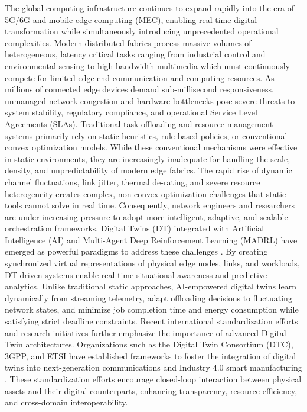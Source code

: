 \documentclass[twoside,twocolumn,10pt]{article}
\begin{document}
The global computing infrastructure continues to expand rapidly into the era of 5G/6G and mobile edge computing (MEC), enabling real-time digital transformation while simultaneously introducing unprecedented operational complexities.
Modern distributed fabrics process massive volumes of heterogeneous, latency critical tasks ranging from industrial control and environmental sensing to high bandwidth multimedia which must continuously compete for limited edge-end communication and computing resources.
As millions of connected edge devices demand sub-millisecond responsiveness, unmanaged network congestion and hardware bottlenecks pose severe threats to system stability, regulatory compliance, and operational Service Level Agreements (SLAs).
Traditional task offloading and resource management systems primarily rely on static heuristics, rule-based policies, or conventional convex optimization models.
While these conventional mechanisms were effective in static environments, they are increasingly inadequate for handling the scale, density, and unpredictability of modern edge fabrics.
The rapid rise of dynamic channel fluctuations, link jitter, thermal de-rating, and severe resource heterogeneity creates complex, non-convex optimization challenges that static tools cannot solve in real time.
Consequently, network engineers and researchers are under increasing pressure to adopt more intelligent, adaptive, and scalable orchestration frameworks.
Digital Twins (DT) integrated with Artificial Intelligence (AI) and Multi-Agent Deep Reinforcement Learning (MADRL) have emerged as powerful paradigms to address these challenges \cite{lv2022, grieves2022}.
By creating synchronized virtual representations of physical edge nodes, links, and workloads, DT-driven systems enable real-time situational awareness and predictive analytics.
Unlike traditional static approaches, AI-empowered digital twins learn dynamically from streaming telemetry, adapt offloading decisions to fluctuating network states, and minimize job completion time and energy consumption while satisfying strict deadline constraints.
Recent international standardization efforts and research initiatives further emphasize the importance of advanced Digital Twin architectures. Organizations such as the Digital Twin Consortium (DTC), 3GPP, and ETSI have established frameworks to foster the integration of digital twins into next-generation communications and Industry 4.0 smart manufacturing \cite{dtc2020, iso23247}. 
These standardization efforts encourage closed-loop interaction between physical assets and their digital counterparts, enhancing transparency, resource efficiency, and cross-domain interoperability.
\end{document}

